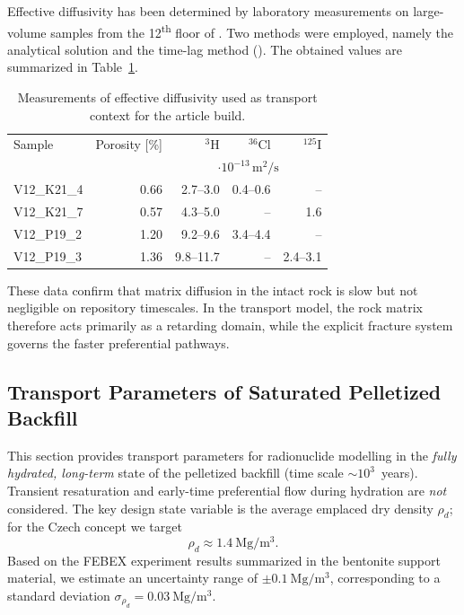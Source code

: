 Effective diffusivity has been determined by laboratory measurements on large-volume samples from the 12\textsuperscript{th} floor of \URFBI. Two methods were employed, namely the analytical solution and the time-lag method (\cite{tz_hh}). The obtained values are summarized in Table~\ref{tab:diffusivity_article}.

\begin{table}[htb]
\centering
\caption{Measurements of effective diffusivity used as transport context for the article build.}
\label{tab:diffusivity_article}
\scriptsize
\begin{tabular}{lrrrr}
\toprule
Sample & Porosity [\%] & ${}^3$H & ${}^{36}$Cl & ${}^{125}$I \\
& & \multicolumn{3}{c}{$\cdot10^{-13}\,\mathrm{m^2/s}$} \\
\midrule
V12\_K21\_4 & 0.66 & 2.7--3.0 & 0.4--0.6 & -- \\
V12\_K21\_7 & 0.57 & 4.3--5.0 & -- & 1.6 \\
V12\_P19\_2 & 1.20 & 9.2--9.6 & 3.4--4.4 & -- \\
V12\_P19\_3 & 1.36 & 9.8--11.7 & -- & 2.4--3.1 \\
\bottomrule
\end{tabular}
\end{table}

These data confirm that matrix diffusion in the intact rock is slow but not negligible on repository timescales. In the transport model, the rock matrix therefore acts primarily as a retarding domain, while the explicit fracture system governs the faster preferential pathways.

\subsection{Transport Parameters of Saturated Pelletized Backfill}
\label{sec:transport_pellets}

This section provides transport parameters for radionuclide modelling in the \emph{fully hydrated, long-term} state of the pelletized backfill (time scale $\sim 10^3$~years). Transient resaturation and early-time preferential flow during hydration are \emph{not} considered. The key design state variable is the average emplaced dry density $\rho_d$; for the Czech concept we target
\[
\rho_d \approx 1.4~\mathrm{Mg/m^3}.
\]
Based on the FEBEX experiment results summarized in the bentonite support material, we estimate an uncertainty range of $\pm 0.1~\mathrm{Mg/m^3}$, corresponding to a standard deviation $\sigma_{\rho_d}=0.03~\mathrm{Mg/m^3}$.

